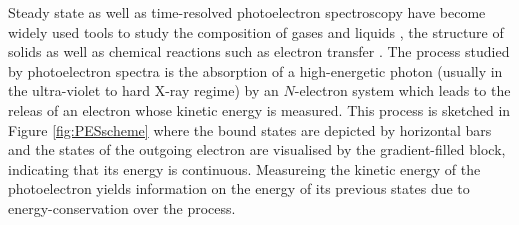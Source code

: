 Steady state as well as time-resolved photoelectron spec\-tros\-co\-py have become widely used tools to study the composition of gases and liquids \cite{winterWater,liquid1,XrayDynamics}, the structure of solids \cite{solid1} as well as chemical reactions such as electron transfer \cite{XrayDynamics}.
The process studied by photoelectron spectra is the absorption of a high-energetic photon (usually in the ultra-violet to hard X-ray regime) by an $N$-electron system which leads to the releas of an electron whose kinetic energy is measured.
This process is sketched in Figure \ref{fig:PESscheme} where the bound states are depicted by horizontal bars and the states of the outgoing electron are visualised by the gradient-filled block, indicating that its energy is continuous.
Measureing the kinetic energy of the photoelectron yields information on the energy of its previous states due to energy-conservation over the process.

